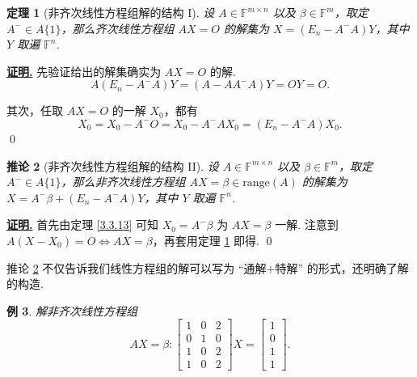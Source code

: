 \documentclass[10pt,openany]{article}
\theoremstyle{thmstyle} %
\newtheorem{theorem}{定理}[subsection]
\theoremstyle{defstyle} %
\newtheorem{corollary}[theorem]{推论}
\theoremstyle{prostyle} %
\theoremstyle{exastyle}
\newtheorem{example}[theorem]{例}
\theoremstyle{remstyle}
\renewenvironment{proof}[1][证明]{\par\underline{\textbf{#1.}} \;\fangsong}{\qed\par}
\newcommand{\F}{\mathbb{F}}
\newcommand{\mn}{^{m \times n}}
\begin{document}
\begin{theorem}[非齐次线性方程组解的结构 I] \label{3.3.14}
	设 \( A \in \F\mn \) 以及 \( \beta \in \F^m \)，取定 \( A^{-} \in A\{1\} \)，那么齐次线性方程组 \( AX=O \) 的解集为 \( X=(E_n-A^{-}A)Y \)，其中 \( Y \) 取遍 \( \F^n \). 
\end{theorem}

\begin{proof}
	先验证给出的解集确实为 \( AX=O \) 的解.
	\[ A(E_n-A^{-}A)Y=(A-AA^{-}A)Y=OY=O. \]
	
	其次，任取 \( AX=O \) 的一解 \( X_0 \)，都有 
	\[ X_0=X_0-A^{-}O=X_0-A^{-}AX_0=(E_n-A^{-}A)X_0. \]
\end{proof}

\begin{corollary}[非齐次线性方程组解的结构 II] \label{3.3.15}
	设 \( A \in \F\mn \) 以及 \( \beta \in \F^m \)，取定 \( A^{-} \in A\{1\} \)，那么非齐次线性方程组 \( AX=\beta \in \text{range}(A) \) 的解集为 \( X=A^{-}\beta+(E_n-A^{-}A)Y \)，其中 \( Y \) 取遍 \( \F^n \). 
\end{corollary}

\begin{proof}
	首先由定理 \ref{3.3.13} 可知 \( X_0=A^{-}\beta \) 为 \( AX=\beta \) 一解. 注意到 \( A(X-X_0)=O \Leftrightarrow AX=\beta \)，再套用定理 \ref{3.3.14} 即得.
\end{proof}

推论 \ref{3.3.15} 不仅告诉我们线性方程组的解可以写为 “通解\(+\)特解” 的形式，还明确了解的构造. 
 
\begin{example}
	解非齐次线性方程组
	\[ AX=\beta: \begin{bmatrix}
		1 & 0 & 2 \\
		0 & 1 & 0 \\
		1 & 0 & 2 \\
		1 & 0 & 2
	\end{bmatrix}X=\begin{bmatrix}
	 1 \\ 0 \\ 1 \\ 1
	\end{bmatrix}. \]
\end{example}
\end{document}

